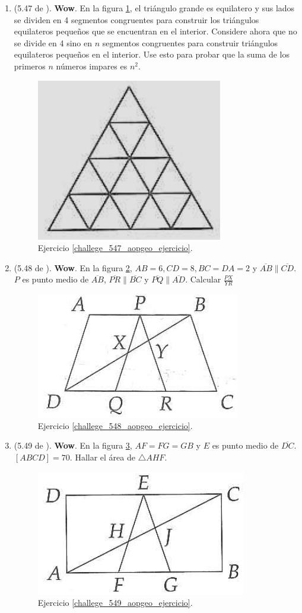 \begin{enumerate}
	\item \label{challege_547_aopgeo_ejercicio}(5.47 de \cite{Aops_Geometria}). \textbf{Wow}. En la figura \ref{challege_547_aopgeo_ejer}, el triángulo grande es equilatero y sus lados se dividen en 4 segmentos congruentes para construir los triángulos equilateros pequeños que se encuentran en el interior. Considere ahora que no se divide en 4 sino en $n$ segmentos congruentes para construir triángulos equilateros pequeños en el interior. Use esto para probar que la suma de los primeros $n$ números impares es $n^2$.
	\begin{figure}[H]
		\centering
		\includegraphics[width=0.3\linewidth]{Geometria/imgs/challege_547_aopgeo_ejer}
		\caption{Ejercicio \ref{challege_547_aopgeo_ejercicio}.}
		\label{challege_547_aopgeo_ejer}
	\end{figure}

	\item \label{challege_548_aopgeo_ejercicio}(5.48 de \cite{Aops_Geometria}). \textbf{Wow}. En la figura \ref{challege_548_aopgeo_ejer}, $AB=6,CD=8,BC=DA=2$ y $\overline{AB} \parallel \overline{CD}$. $P$ es punto medio de $\overline{AB}$, $\overline{PR} \parallel \overline{BC}$ y $\overline{PQ} \parallel \overline{AD}$. Calcular $\frac{PX}{YR}$
	\begin{figure}[H]
		\centering
		\includegraphics[width=0.4\linewidth]{Geometria/imgs/challege_548_aopgeo_ejer}
		\caption{Ejercicio \ref{challege_548_aopgeo_ejercicio}.}
		\label{challege_548_aopgeo_ejer}
	\end{figure}

	\item \label{challege_549_aopgeo_ejercicio}(5.49 de \cite{Aops_Geometria}). \textbf{Wow}. En la figura \ref{challege_549_aopgeo_ejer}, $AF=FG=GB$ y $E$ es punto medio de $\overline{DC}$. $[ABCD]=70$. Hallar el área de $\triangle AHF$.
	\begin{figure}[H]
		\centering
		\includegraphics[width=0.4\linewidth]{Geometria/imgs/challege_549_aopgeo_ejer}
		\caption{Ejercicio \ref{challege_549_aopgeo_ejercicio}.}
		\label{challege_549_aopgeo_ejer}
	\end{figure}


\end{enumerate}
